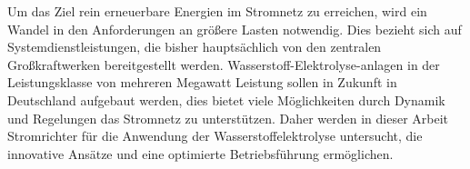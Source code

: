 Um das Ziel rein erneuerbare Energien im Stromnetz zu erreichen, wird ein Wandel in den Anforderungen an größere Lasten notwendig. Dies bezieht sich auf Systemdienstleistungen, die bisher hauptsächlich von den zentralen Großkraftwerken bereitgestellt werden. Wasserstoff-Elektrolyse-anlagen in der Leistungsklasse von mehreren Megawatt Leistung sollen in Zukunft in Deutschland aufgebaut werden, dies bietet viele Möglichkeiten durch Dynamik und Regelungen das Stromnetz zu unterstützen. Daher werden in dieser Arbeit Stromrichter für die Anwendung der Wasserstoffelektrolyse untersucht, die innovative Ansätze und eine optimierte Betriebsführung ermöglichen. 